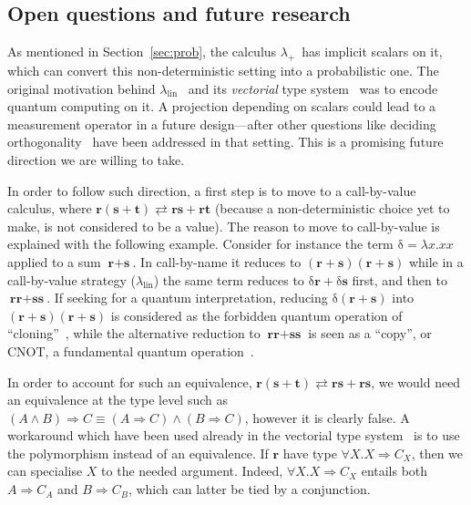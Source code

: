 \documentclass[final,copyright,creativecommons]{eptcs}
\newcommand{\OurCalculus}{\ensuremath{\lambda_+}}
\newcommand{\eq}{\ensuremath{\rightleftarrows}}
\newcommand{\ve}[1]{\ensuremath{\mathrm{\textbf{#1}}}}
\theoremstyle{definition}
\begin{document}
\subsection{Open questions and future research}
As mentioned in Section~\ref{sec:prob}, the calculus \OurCalculus\ has implicit scalars on it, which can convert this non-deterministic setting into a probabilistic one. The original motivation behind $\lambda_{\textrm{lin}}$~\cite{ArrighiDowekRTA08} and its {\em vectorial} type system~\cite{ArrighiDiazcaroValironDCM11} was to encode quantum computing on it. A projection depending on scalars could lead to a measurement operator in a future design---after other questions like deciding orthogonality~\cite{ValironQPL10} have been addressed in that setting. This is a promising future direction we are willing to take.

In order to follow such direction, a first step is to move to a call-by-value calculus, where $\ve r(\ve s+\ve t)\eq\ve r\ve s+\ve r\ve t$ (because a non-deterministic choice yet to make, is not considered to be a value). The reason to move to call-by-value is explained with the following example. Consider for instance the term $\ve{$\delta$}=\lambda x.xx$ applied to a sum $\ve r+\ve s$. In call-by-name it reduces to $(\ve r+\ve s)(\ve r+\ve s)$ while in a call-by-value strategy  ($\lambda_{\textrm{lin}}$) the same term reduces to $\ve{$\delta$}\ve r+\ve{$\delta$}\ve s$ first, and then to $\ve r\ve r+\ve s\ve s$. If seeking for a quantum interpretation, reducing $\ve{$\delta$}(\ve r+\ve s)$ into $(\ve r+\ve s)(\ve r+\ve s)$ is considered as the forbidden quantum operation of ``cloning''~\cite{WoottersZurekNATURE82}, while the alternative reduction to $\ve r\ve r+\ve s\ve s$ is seen as a ``copy'', or CNOT, a fundamental quantum operation~\cite{MonroeMeekhofKingItanoWinelandPRL95}.

In order to account for such an equivalence, $\ve r(\ve s+\ve t)\eq\ve r\ve s+\ve r\ve s$, we would need an equivalence at the type level such as
$(A\wedge B)\Rightarrow C\equiv (A\Rightarrow C)\wedge(B\Rightarrow C)$,
however it is clearly false. A workaround which have been used already in the vectorial type system~\cite{ArrighiDiazcaroValironDCM11} is to use the polymorphism instead of an equivalence. If $\ve r$ have type $\forall X.X\Rightarrow C_X$, then we can specialise $X$ to the needed argument. Indeed,
$\forall X.X\Rightarrow C_X$ entails both $A\Rightarrow C_A$ and $B\Rightarrow C_B$, which can latter be tied by a conjunction.
\medskip
\end{document}
